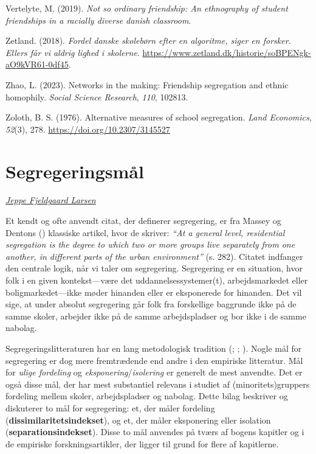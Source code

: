\documentclass[
]{book}
\newlength{\cslhangindent}
\newenvironment{CSLReferences}[2] %
 {\begin{list}{}{%
  \setlength{\itemindent}{0pt}
  \setlength{\leftmargin}{0pt}
  \setlength{\parsep}{0pt}
  \ifodd #1
   \setlength{\leftmargin}{\cslhangindent}
   \setlength{\itemindent}{-1\cslhangindent}
  \fi
  \setlength{\itemsep}{#2\baselineskip}}}
 {\end{list}}
\begin{document}
\begin{CSLReferences}{1}{0}
Vertelyte, M. (2019). \emph{Not so ordinary friendship: An ethnography of student friendships in a racially diverse danish classroom}.

Zetland. (2018). \emph{Fordel danske skolebørn efter en algoritme, siger en forsker. Ellers får vi aldrig lighed i skolerne}. \url{https://www.zetland.dk/historie/soBPENgk-aO9kVR61-0df45}.

Zhao, L. (2023). Networks in the making: Friendship segregation and ethnic homophily. \emph{Social Science Research}, \emph{110}, 102813.

Zoloth, B. S. (1976). Alternative measures of school segregation. \emph{Land Economics}, \emph{52}(3), 278. \url{https://doi.org/10.2307/3145527}

\end{CSLReferences}

\appendix


\chapter{Segregeringsmål}\label{bilag1}

\emph{\href{https://vbn.aau.dk/da/persons/jeppefl}{Jeppe Fjeldgaard Larsen}}

Et kendt og ofte anvendt citat, der definerer segregering, er fra Massey og Dentons () klassiske artikel, hvor de skriver: \emph{``At a general level, residential segregation is the degree to which two or more groups live separately from one another, in different parts of the urban environment''} (s. 282). Citatet indfanger den centrale logik, når vi taler om segregering. Segregering er en situation, hvor folk i en given kontekst---være det uddannelsessystemer(t), arbejdsmarkedet eller boligmarkedet---ikke møder hinanden eller er eksponerede for hinanden. Det vil sige, at under absolut segregering går folk fra forskellige baggrunde ikke på de samme skoler, arbejder ikke på de samme arbejdspladser og bor ikke i de samme nabolag.

Segregeringslitteraturen har en lang metodologisk tradition (; ; ). Nogle mål for segregering er dog mere fremtrædende end andre i den empiriske litteratur. Mål for \emph{ulige fordeling} og \emph{eksponering}/\emph{isolering} er generelt de mest anvendte. Det er også disse mål, der har mest substantiel relevans i studiet af (minoritets)gruppers fordeling mellem skoler, arbejdspladser og nabolag. Dette bilag beskriver og diskuterer to mål for segregering: et, der måler fordeling (\textbf{dissimilaritetsindekset}), og et, der måler eksponering eller isolation (\textbf{separationsindekset}). Disse to mål anvendes på tværs af bogens kapitler og i de empiriske forskningsartikler, der ligger til grund for flere af kapitlerne.
\end{document}

